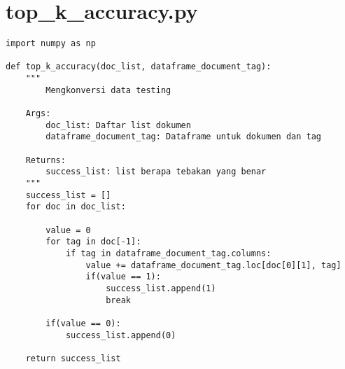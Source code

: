 \chapter{top\_k\_accuracy.py}
\begin{lstlisting}[breaklines=true]
import numpy as np

def top_k_accuracy(doc_list, dataframe_document_tag):
	"""
		Mengkonversi data testing

	Args:
		doc_list: Daftar list dokumen
		dataframe_document_tag: Dataframe untuk dokumen dan tag
		
	Returns:
		success_list: list berapa tebakan yang benar
	"""
	success_list = []
	for doc in doc_list:
		
		value = 0
		for tag in doc[-1]:
			if tag in dataframe_document_tag.columns:
				value += dataframe_document_tag.loc[doc[0][1], tag]
				if(value == 1):
					success_list.append(1)
					break
		
		if(value == 0):
			success_list.append(0)
	
	return success_list
\end{lstlisting}

		
		
				
				
				
				
				
